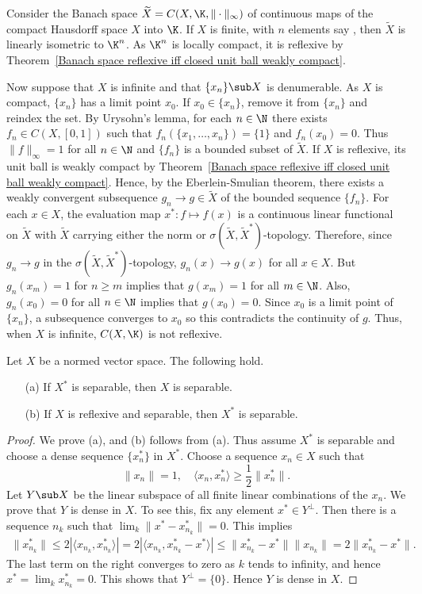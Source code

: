 \begin{example}
Consider the Banach space $\widetilde{X}=C(X,\K,\|\cdot\|_\infty)$ of continuous maps of the compact Hausdorff space $X$ into $\K$. If $X$ is finite, with $n$ elements say , then $\widetilde{X}$ is linearly isometric to $\K^n$. As $\K^n$ is locally compact, it is reflexive by Theorem~\ref{Banach space reflexive iff closed unit ball weakly compact}.\par
Now suppose that $X$ is infinite and that $\{x_n\}\sub X$ is denumerable. As $X$ is compact, $\{x_n\}$ has a limit point $x_0$. If $x_0\in\{x_n\}$, remove it from $\{x_n\}$ and reindex the set. By Urysohn's lemma, for each $n\in\N$ there exists $f_n\in C(X,[0,1])$ such that $f_n(\{x_1,\dots,x_n\})=\{1\}$ and $f_n(x_0)=0$. Thus $\|f\|_\infty=1$ for all $n\in\N$ and $\{f_n\}$ is a bounded subset of $\widetilde{X}$. If $X$ is reflexive, its unit ball is weakly compact by Theorem~\ref{Banach space reflexive iff closed unit ball weakly compact}. Hence, by the Eberlein-Smulian theorem, there exists a weakly convergent subsequence $g_n\to g\in\widetilde{X}$ of the bounded sequence $\{f_n\}$. For each $x\in X$, the evaluation map $x^*:f\mapsto f(x)$ is a continuous linear functional on $\widetilde{X}$ with $\widetilde{X}$ carrying either the norm or $\sigma(\widetilde{X},\widetilde{X}^*)$-topology. Therefore, since $g_n\to g$ in the $\sigma(\widetilde{X},\widetilde{X}^*)$-topology, $g_n(x)\to g(x)$ for all $x\in X$. But $g_n(x_m)=1$ for $n\geq m$ implies that $g(x_m)=1$ for all $m\in\N$. Also, $g_n(x_0)=0$ for all $n\in\N$ implies that $g(x_0)=0$. Since $x_0$ is a limit point of $\{x_n\}$, a subsequence converges to $x_0$ so this contradicts the continuity of $g$. Thus, when $X$ is infinite, $C(X,\K)$ is not reflexive.
\end{example}
\begin{proposition}\label{NVS separable prop}
Let $X$ be a normed vector space. The following hold.
\begin{itemize}
\item[(a)] If $X^*$ is separable, then $X$ is separable.
\item[(b)] If $X$ is reflexive and separable, then $X^*$ is separable.
\end{itemize}
\end{proposition}
\begin{proof}
We prove (a), and (b) follows from (a). Thus assume $X^*$ is separable and choose a dense sequence $\{x_n^*\}$ in $X^*$. Choose a sequence $x_n\in X$ such that
\[\|x_n\|=1,\quad \langle x_n,x_n^*\rangle\geq\frac{1}{2}\|x_n^*\|.\]
Let $Y\sub X$ be the linear subspace of all finite linear combinations of the $x_n$. We prove that $Y$ is dense in $X$. To see this, fix any element $x^*\in Y^\bot$. Then there is a sequence $n_k$ such that $\lim_k\|x^*-x_{n_k}^*\|=0$. This implies
\begin{align*}
\|x_{n_k}^*\|\leq 2|\langle x_{n_k},x_{n_k}^*\rangle|=2|\langle x_{n_k},x_{n_k}^*-x^*\rangle|\leq\|x_{n_k}^*-x^*\|\|x_{n_k}\|=2\|x_{n_k}^*-x^*\|.
\end{align*}
The last term on the right converges to zero as $k$ tends to infinity, and
hence $x^*=\lim_{k}x_{n_k}^*=0$. This shows that $Y^{\bot}=\{0\}$. Hence $Y$ is dense in $X$.
\end{proof}
